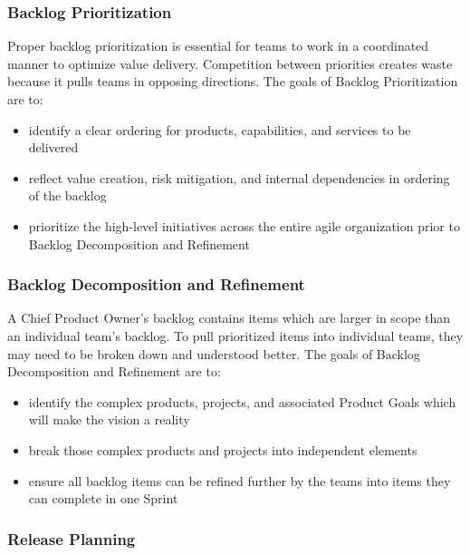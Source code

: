 \documentclass[12pt,a4paper,parskip=full]{scrartcl}
\begin{document}
\subsubsection{Backlog Prioritization}\label{backlog-prioritization}

Proper backlog prioritization is essential for teams to work in a coordinated manner to optimize value delivery. Competition between priorities creates waste because it pulls teams in opposing directions. The goals of Backlog Prioritization are to:

\begin{itemize}
\itemsep1pt\parskip0pt
\item
  identify a clear ordering for products, capabilities, and services to
  be delivered
\item
  reflect value creation, risk mitigation, and internal dependencies in
  ordering of the backlog
\item
  prioritize the high-level initiatives across the entire agile
  organization prior to Backlog Decomposition and Refinement
\end{itemize}

\subsubsection{Backlog Decomposition and
Refinement}\label{backlog-decomposition-and-refinement}

A Chief Product Owner's backlog contains items which are larger in scope than an individual team's backlog. To pull prioritized items into individual teams, they may need to be broken down and understood better. The goals of Backlog Decomposition and Refinement are to:

\begin{itemize}
\itemsep1pt\parskip0pt
\item
  identify the complex products, projects, and associated Product Goals which will make the vision a reality
\item
  break those complex products and projects into independent elements
\item
  ensure all backlog items can be refined further by the teams into items they can complete in one Sprint
\end{itemize}

\subsubsection{Release Planning}\label{Release-planning}
\end{document}

